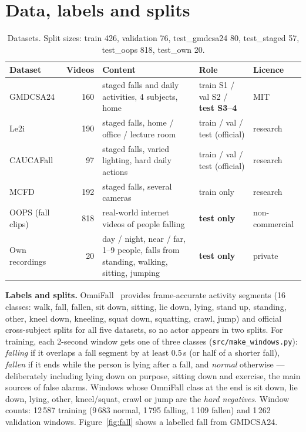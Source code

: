 \documentclass[11pt,a4paper]{article}
\newcommand{\code}[1]{\texttt{\small #1}}
\begin{document}
\section{Data, labels and splits}
\begin{table}[H]\centering\small
\begin{tabularx}{\textwidth}{@{}lrXll@{}}\toprule
\textbf{Dataset} & \textbf{Videos} & \textbf{Content} & \textbf{Role} & \textbf{Licence}\\ \midrule
GMDCSA24 & 160 & staged falls and daily activities, 4 subjects, home & train S1 / val S2 / \textbf{test S3--4} & MIT\\
Le2i & 190 & staged falls, home / office / lecture room & train / val / test (official) & research\\
CAUCAFall & 97 & staged falls, varied lighting, hard daily actions & train / val / test (official) & research\\
MCFD & 192 & staged falls, several cameras & train only & research\\
OOPS (fall clips) & 818 & real-world internet videos of people falling & \textbf{test only} & non-commercial\\
Own recordings & 20 & day / night, near / far, 1--9 people, falls from standing, walking, sitting, jumping & \textbf{test only} & private\\
\bottomrule\end{tabularx}
\caption{Datasets. Split sizes: train 426, validation 76, test\_gmdcsa24 80, test\_staged 57, test\_oops 818, test\_own 20.}
\end{table}

\textbf{Labels and splits.} OmniFall~\cite{omnifall} provides frame-accurate activity segments (16 classes:
walk, fall, fallen, sit down, sitting, lie down, lying, stand up, standing, other, kneel down, kneeling, squat down,
squatting, crawl, jump) and official cross-subject splits for all five datasets, so no actor appears in two
splits. For training, each 2-second window gets one of three classes (\code{src/make\_windows.py}):
\emph{falling} if it overlaps a fall segment by at least 0.5\,s (or half of a shorter fall), \emph{fallen} if it
ends while the person is lying after a fall, and \emph{normal} otherwise --- deliberately including lying down
on purpose, sitting down and exercise, the main sources of false alarms. Windows whose OmniFall class at the end
is sit down, lie down, lying, other, kneel/squat, crawl or jump are the \emph{hard negatives}. Window counts:
12\,587 training (9\,683 normal, 1\,795 falling, 1\,109 fallen) and 1\,262 validation windows.
Figure~\ref{fig:fall} shows a labelled fall from GMDCSA24.
\end{document}

